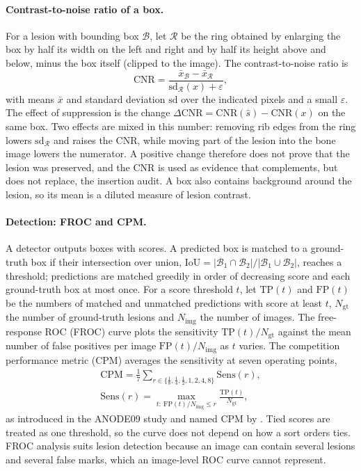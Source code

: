 \paragraph{Contrast-to-noise ratio of a box.} For a lesion with bounding box $\mathcal{B}$, let $\mathcal{R}$ be the ring obtained by enlarging
the box by half its width on the left and right and by half its height above and below, minus the box itself (clipped to the image). The
contrast-to-noise ratio is
\begin{equation}
\mathrm{CNR}=\frac{\bar x_{\mathcal{B}}-\bar x_{\mathcal{R}}}{\mathrm{sd}_{\mathcal{R}}(x)+\varepsilon},
\label{eq:bg_cnr}
\end{equation}
with means $\bar x$ and standard deviation $\mathrm{sd}$ over the indicated pixels and a small $\varepsilon$. The effect of suppression is the
change $\Delta\mathrm{CNR}=\mathrm{CNR}(\hat s)-\mathrm{CNR}(x)$ on the same box. Two effects are mixed in this number: removing rib edges from
the ring lowers $\mathrm{sd}_{\mathcal{R}}$ and raises the CNR, while moving part of the lesion into the bone image lowers the numerator. A
positive change therefore does not prove that the lesion was preserved, and the CNR is used as evidence that complements, but does not replace,
the insertion audit. A box also contains background around the lesion, so its mean is a diluted measure of lesion contrast.

\paragraph{Detection: FROC and CPM.} A detector outputs boxes with scores. A predicted box is matched to a ground-truth box if their
intersection over union, $\mathrm{IoU}=|\mathcal{B}_1\cap\mathcal{B}_2|/|\mathcal{B}_1\cup\mathcal{B}_2|$, reaches a threshold; predictions are
matched greedily in order of decreasing score and each ground-truth box at most once. For a score threshold $t$, let $\mathrm{TP}(t)$ and
$\mathrm{FP}(t)$ be the numbers of matched and unmatched predictions with score at least $t$, $N_{\mathrm{gt}}$ the number of ground-truth
lesions and $N_{\mathrm{img}}$ the number of images. The free-response ROC (FROC) curve plots the sensitivity
$\mathrm{TP}(t)/N_{\mathrm{gt}}$ against the mean number of false positives per image $\mathrm{FP}(t)/N_{\mathrm{img}}$ as $t$ varies. The
competition performance metric (CPM) averages the sensitivity at seven operating points,
\begin{equation}
\begin{gathered}
\mathrm{CPM}=\frac17\sum_{r\in\{\frac18,\frac14,\frac12,1,2,4,8\}}\mathrm{Sens}(r),\\
\mathrm{Sens}(r)=\max_{t:\ \mathrm{FP}(t)/N_{\mathrm{img}}\le r}\frac{\mathrm{TP}(t)}{N_{\mathrm{gt}}},
\end{gathered}
\label{eq:bg_cpm}
\end{equation}
as introduced in the ANODE09 study and named CPM by \citet{niemeijer2011cpm} \citep[see also][]{vanginneken2010anode09,setio2017luna16}. Tied
scores are treated as one threshold, so the curve does not depend on how a sort orders ties. FROC analysis suits lesion detection because an
image can contain several lesions and several false marks, which an image-level ROC curve cannot represent.

